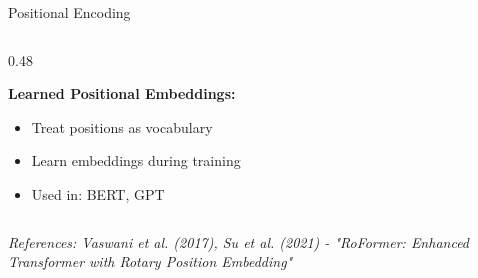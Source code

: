 \documentclass[aspectratio=169]{beamer}
\begin{document}
\begin{frame}[shrink=10]{Positional Encoding 📍}
\begin{columns}[T]
\begin{column}{0.48\textwidth}
\vspace{1em}

\textbf{Learned Positional Embeddings:}
\begin{itemize}\setlength{\itemsep}{0pt}
    \item Treat positions as vocabulary
    \item Learn embeddings during training
    \item Used in: BERT, GPT
\end{itemize}
\end{column}
\end{columns}

\vspace{0.5em}
\small
\textit{References: Vaswani et al. (2017), Su et al. (2021) - "RoFormer: Enhanced Transformer with Rotary Position Embedding"}
\end{frame}
\end{document}
